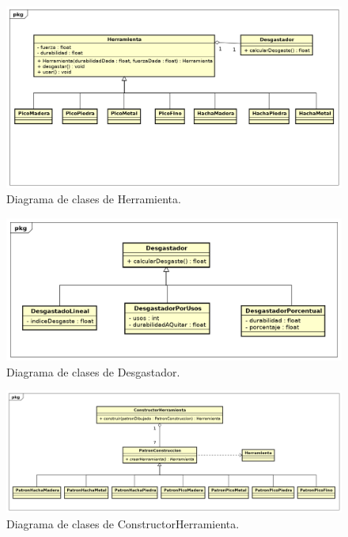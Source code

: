 \documentclass[titlepage,a4paper]{article}
\begin{document}
\begin{figure}[H]
\centering
\includegraphics[width=\textwidth]{Diagramas/Herramienta.png}
\caption{\label{fig:herramienta}Diagrama de clases de Herramienta.}
\end{figure}

\begin{figure}[H]
\centering
\includegraphics[width=\textwidth]{Diagramas/Desgastador.png}
\caption{\label{fig:desgastador}Diagrama de clases de Desgastador.}
\end{figure}

\begin{figure}[H]
\centering
\includegraphics[width=\textwidth]{Diagramas/ConstructorHerramienta.png}
\caption{\label{fig:constructor}Diagrama de clases de ConstructorHerramienta.}
\end{figure}
\end{document}

